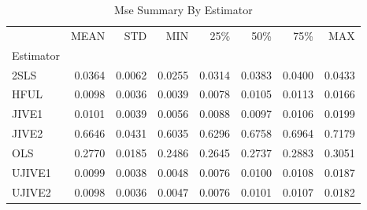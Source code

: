 \begin{table}[ht]
\centering
\caption{Mse Summary By Estimator}
\begin{tabular}{lrrrrrrr}
\toprule
 & MEAN & STD & MIN & 25\% & 50\% & 75\% & MAX \\
Estimator &  &  &  &  &  &  &  \\
\midrule
2SLS & 0.0364 & 0.0062 & 0.0255 & 0.0314 & 0.0383 & 0.0400 & 0.0433 \\
HFUL & 0.0098 & 0.0036 & 0.0039 & 0.0078 & 0.0105 & 0.0113 & 0.0166 \\
JIVE1 & 0.0101 & 0.0039 & 0.0056 & 0.0088 & 0.0097 & 0.0106 & 0.0199 \\
JIVE2 & 0.6646 & 0.0431 & 0.6035 & 0.6296 & 0.6758 & 0.6964 & 0.7179 \\
OLS & 0.2770 & 0.0185 & 0.2486 & 0.2645 & 0.2737 & 0.2883 & 0.3051 \\
UJIVE1 & 0.0099 & 0.0038 & 0.0048 & 0.0076 & 0.0100 & 0.0108 & 0.0187 \\
UJIVE2 & 0.0098 & 0.0036 & 0.0047 & 0.0076 & 0.0101 & 0.0107 & 0.0182 \\
\bottomrule
\end{tabular}
\end{table}
